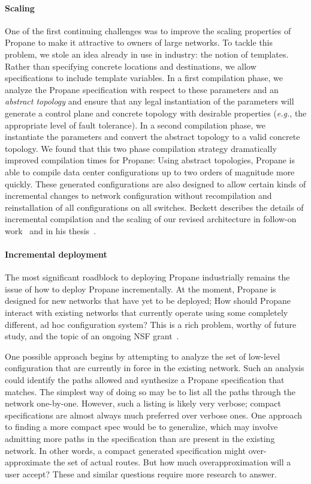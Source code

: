 \documentclass[10pt]{sigalternate052015}
\begin{document}
\paragraph*{Scaling} One of the first continuing challenges was to improve the scaling
properties of Propane to make it attractive to owners of large
networks.  To tackle this problem, we stole an idea already in use in
industry: the notion of templates.  Rather than specifying concrete
locations and destinations, we allow specifications to include
template variables.  In a first compilation phase, we analyze the
Propane specification with respect to these parameters and an
\emph{abstract topology} and ensure that any legal instantiation of
the parameters will generate a control plane and concrete topology
with desirable properties (\emph{e.g.}, the appropriate level of fault
tolerance).  In a second compilation phase, we instantiate the
parameters and convert the abstract topology to a valid concrete
topology.  We found that this two phase compilation strategy
dramatically improved compilation times for Propane:  Using abstract
topologies, Propane is able to compile data center configurations up to two
orders of magnitude more quickly.  These generated configurations are also designed to
allow certain kinds of incremental changes to network configuration
without recompilation and reinstallation of all configurations on all
switches.  Beckett describes the details of incremental compilation and the scaling of
our revised architecture in follow-on work~\cite{abstract-propane} and
in his thesis~\cite{beckett:thesis}.

\paragraph*{Incremental deployment}  The most significant roadblock to
deploying Propane industrially remains the issue of how to deploy
Propane incrementally.  At the moment, Propane is designed for new
networks that have yet to be deployed; How should Propane interact
with existing networks that currently operate using some completely different, ad
hoc configuration system?  This is a rich problem, worthy of future
study, and the topic of an ongoing NSF grant~\cite{nsf-propane}.

One possible approach begins by attempting to analyze the set of
low-level configuration that are currently in force in the existing
network.  Such an analysis could identify the paths allowed and
synthesize a Propane specification that matches.  The simplest way of
doing so may be to list all the paths through the network one-by-one.
However, such a listing is likely very verbose; compact specifications
are almost always much preferred over verbose ones.  One approach to
finding a more compact spec would be to generalize, which may involve
admitting more paths in the specification than are present in the
existing network.  In other words, a compact generated specification
might over-approximate the set of actual routes.  But how much
overapproximation will a user accept?  These and similar questions
require more research to answer.  
\end{document}
